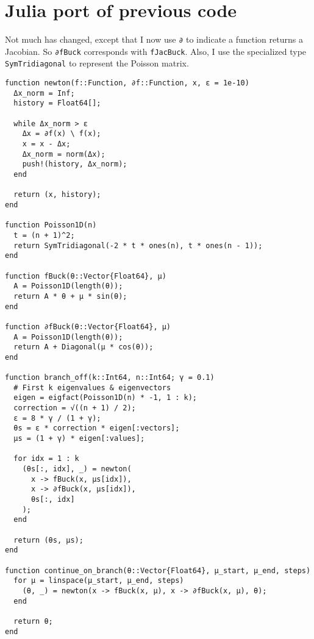 \documentclass[a4paper]{article}
\begin{document}
  \section{Julia port of previous code}
  Not much has changed, except that I now use {\tt ∂} to indicate a function returns a Jacobian. So {\tt ∂fBuck} corresponds with {\tt fJacBuck}. Also, I use the specialized type {\tt SymTridiagonal} to represent the Poisson matrix.
\begin{verbatim}
function newton(f::Function, ∂f::Function, x, ɛ = 1e-10)
  Δx_norm = Inf;
  history = Float64[];

  while Δx_norm > ɛ
    Δx = ∂f(x) \ f(x);
    x = x - Δx;
    Δx_norm = norm(Δx);
    push!(history, Δx_norm);
  end

  return (x, history);
end

function Poisson1D(n)
  t = (n + 1)^2;
  return SymTridiagonal(-2 * t * ones(n), t * ones(n - 1));
end

function fBuck(θ::Vector{Float64}, μ)
  A = Poisson1D(length(θ));
  return A * θ + μ * sin(θ);
end

function ∂fBuck(θ::Vector{Float64}, μ)
  A = Poisson1D(length(θ));
  return A + Diagonal(μ * cos(θ));
end

function branch_off(k::Int64, n::Int64; γ = 0.1)
  # First k eigenvalues & eigenvectors
  eigen = eigfact(Poisson1D(n) * -1, 1 : k);
  correction = √((n + 1) / 2);
  ɛ = 8 * γ / (1 + γ);
  θs = ɛ * correction * eigen[:vectors];
  μs = (1 + γ) * eigen[:values];

  for idx = 1 : k
    (θs[:, idx], _) = newton(
      x -> fBuck(x, μs[idx]),
      x -> ∂fBuck(x, μs[idx]), 
      θs[:, idx]
    );
  end

  return (θs, μs);
end

function continue_on_branch(θ::Vector{Float64}, μ_start, μ_end, steps)
  for μ = linspace(μ_start, μ_end, steps)
    (θ, _) = newton(x -> fBuck(x, μ), x -> ∂fBuck(x, μ), θ);
  end

  return θ;
end
\end{verbatim}
\end{document}
